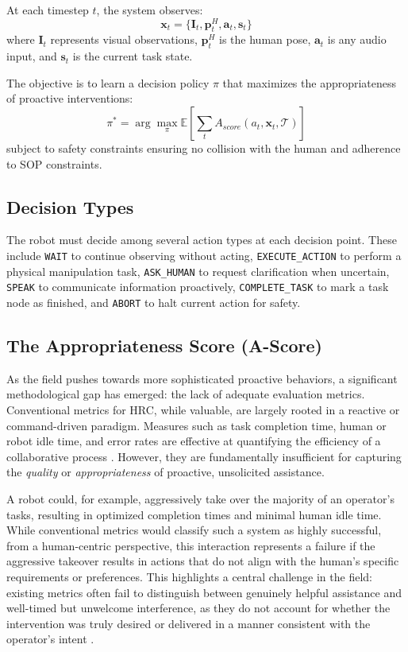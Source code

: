 At each timestep $t$, the system observes:
\begin{equation}
    \mathbf{x}_t = \{\mathbf{I}_t, \mathbf{p}^H_t, \mathbf{a}_t, \mathbf{s}_t\}
\end{equation}
where $\mathbf{I}_t$ represents visual observations, $\mathbf{p}^H_t$ is the human pose, $\mathbf{a}_t$ is any audio input, and $\mathbf{s}_t$ is the current task state.

The objective is to learn a decision policy $\pi$ that maximizes the appropriateness of proactive interventions:
\begin{equation}
    \pi^* = \arg\max_\pi \mathbb{E}\left[\sum_{t} A_{score}(a_t, \mathbf{x}_t, \mathcal{T})\right]
\end{equation}
subject to safety constraints ensuring no collision with the human and adherence to SOP constraints.

\subsection{Decision Types}

The robot must decide among several action types at each decision point. These include \texttt{WAIT} to continue observing without acting, \texttt{EXECUTE\_ACTION} to perform a physical manipulation task, \texttt{ASK\_HUMAN} to request clarification when uncertain, \texttt{SPEAK} to communicate information proactively, \texttt{COMPLETE\_TASK} to mark a task node as finished, and \texttt{ABORT} to halt current action for safety.

\subsection{The Appropriateness Score (A-Score)}

As the field pushes towards more sophisticated proactive behaviors, a significant methodological gap has emerged: the lack of adequate evaluation metrics. Conventional metrics for HRC, while valuable, are largely rooted in a reactive or command-driven paradigm. Measures such as task completion time, human or robot idle time, and error rates are effective at quantifying the efficiency of a collaborative process \citep{Umbrico2022}. However, they are fundamentally insufficient for capturing the \emph{quality} or \emph{appropriateness} of proactive, unsolicited assistance.

A robot could, for example, aggressively take over the majority of an operator's tasks, resulting in optimized completion times and minimal human idle time. While conventional metrics would classify such a system as highly successful, from a human-centric perspective, this interaction represents a failure if the aggressive takeover results in actions that do not align with the human's specific requirements or preferences. This highlights a central challenge in the field: existing metrics often fail to distinguish between genuinely helpful assistance and well-timed but unwelcome interference, as they do not account for whether the intervention was truly desired or delivered in a manner consistent with the operator's intent \citep{Makris2023, Cotta2023}.

